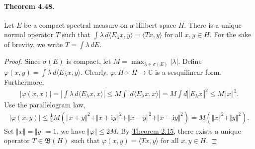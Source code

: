 \documentclass{article}
\renewcommand{\i}{\mathrm{i}}
\begin{document}
\paragraph{Theorem 4.48.\label{thm:4.48}} Let $E$ be a compact spectral measure on a Hilbert space $H$. There is a unique normal operator $T$ such that $\int\lambda\,d\langle E_\lambda x,y\rangle=\langle Tx,y\rangle$ for all $x,y\in H$. For the sake of brevity, we write $T=\int\lambda\,dE$.
\begin{proof}
Since $\sigma(E)$ is compact, let $M=\max_{\lambda\in\sigma(E)}\vert\lambda\vert$. Define $\varphi(x,y)=\int\lambda\,d\langle E_\lambda x,y\rangle$. Clearly, $\varphi:H\times H\to\mathbb{C}$ is a sesquilinear form. Furthermore,
\begin{align*}
	\vert\varphi(x,x)\vert=\left\vert\int\lambda\,d\langle E_\lambda x,x\rangle\right\vert \leq M \int\left\vert d\langle E_\lambda x,x\rangle\right\vert = M \int d\left\Vert E_\lambda x \right\Vert^2\leq M\left\Vert x\right\Vert^2.
\end{align*} 
Use the parallelogram law,
\begin{align*}
	\vert\varphi(x,y)\vert\leq\frac{1}{4}M\left(\Vert x+y\Vert^2 + \Vert x+\i y\Vert^2 + \Vert x-y\Vert^2 + \Vert x-\i y\Vert^2\right) = M\left(\Vert x\Vert^2 + \Vert y\Vert^2\right).
\end{align*}
Set $\Vert x\Vert=\Vert y\Vert =1$, we have $\Vert\varphi\Vert \leq 2M$. By \hyperref[thm:2.15]{Theorem 2.15}, there exists a unique operator $T\in\mathfrak{B}(H)$ such that $\varphi(x,y)=\langle Tx,y\rangle$ for all $x,y\in H$.\vspace{0.1cm}


\end{proof}
\end{document}
